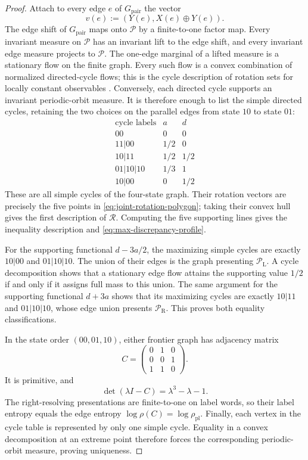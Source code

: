 \begin{proof}
Attach to every edge \(e\) of \(G_{\mathrm{pair}}\) the vector
\[
v(e):=(Y(e),X(e)\oplus Y(e)).
\]
The edge shift of \(G_{\mathrm{pair}}\) maps onto \(\mathcal P\) by a
finite-to-one factor map. Every invariant measure on \(\mathcal P\) has an
invariant lift to the edge shift, and every invariant edge measure projects
to \(\mathcal P\). The one-edge marginal of a lifted measure is a stationary
flow on the finite graph. Every such flow is a convex combination of
normalized directed-cycle flows; this is the cycle description of rotation
sets for locally constant observables \cite{Ziemian1995}. Conversely, each
directed cycle supports an invariant periodic-orbit measure. It is therefore
enough to list the simple directed cycles, retaining the two choices on the
parallel edges from state \(10\) to state \(01\):
\[
\begin{array}{c|c|c}
\text{cycle labels}&a&d\\ \hline
00&0&0\\
11|00&1/2&0\\
10|11&1/2&1/2\\
01|10|10&1/3&1\\
10|00&0&1/2
\end{array}
\]
These are all simple cycles of the four-state graph. Their rotation vectors
are precisely the five points in \eqref{eq:joint-rotation-polygon}; taking
their convex hull gives the first description of \(\mathcal R\). Computing
the five supporting lines gives the inequality description and
\eqref{eq:max-discrepancy-profile}.

For the supporting functional \(d-3a/2\), the maximizing simple cycles are
exactly \(10|00\) and \(01|10|10\). The union of their edges is the graph
presenting \(\mathcal P_{\mathrm L}\). A cycle decomposition shows that a
stationary edge flow attains the supporting value \(1/2\) if and only if it
assigns full mass to this union. The same argument for the supporting
functional \(d+3a\) shows that its maximizing cycles are exactly
\(10|11\) and \(01|10|10\), whose edge union presents
\(\mathcal P_{\mathrm R}\). This proves both equality classifications.

In the state order \((00,01,10)\), either frontier graph has adjacency matrix
\[
C=
\begin{pmatrix}
0&1&0\\
0&0&1\\
1&1&0
\end{pmatrix}.
\]
It is primitive, and
\[
\det(\lambda I-C)=\lambda^3-\lambda-1.
\]
The right-resolving presentations are finite-to-one on label words, so their
label entropy equals the edge entropy \(\log\rho(C)=\log\rho_{\mathrm{pl}}\).
Finally, each vertex in the cycle table is represented by only one simple
cycle. Equality in a convex decomposition at an extreme point therefore
forces the corresponding periodic-orbit measure, proving uniqueness.
\end{proof}
